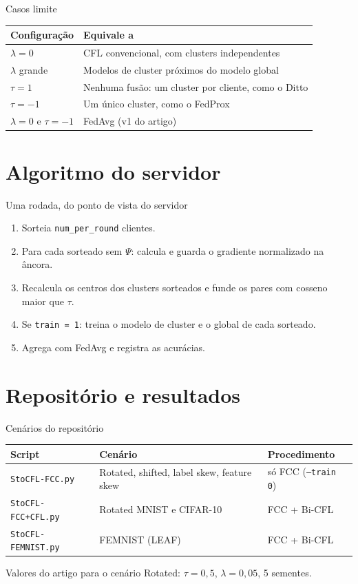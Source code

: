 \documentclass[aspectratio=169]{beamer}
\begin{document}
\begin{frame}{Casos limite}
  \begin{center}
    \begin{tabular}{@{}ll@{}}
      \toprule
      Configuração & Equivale a \\
      \midrule
      $\lambda = 0$ & CFL convencional, com clusters independentes \\
      $\lambda$ grande & Modelos de cluster próximos do modelo global \\
      $\tau = 1$ & Nenhuma fusão: um cluster por cliente, como o Ditto \\
      $\tau = -1$ & Um único cluster, como o FedProx \\
      $\lambda = 0$ e $\tau = -1$ & FedAvg (v1 do artigo) \\
      \bottomrule
    \end{tabular}
  \end{center}
\end{frame}

\section{Algoritmo do servidor}

\begin{frame}{Uma rodada, do ponto de vista do servidor}
  \begin{enumerate}
    \item Sorteia \texttt{num\_per\_round} clientes.
    \item Para cada sorteado sem $\Psi$: calcula e guarda o gradiente normalizado na âncora.
    \item Recalcula os centros dos clusters sorteados e funde os pares com cosseno maior que $\tau$.
    \item Se \texttt{train = 1}: treina o modelo de cluster e o global de cada sorteado.
    \item Agrega com FedAvg e registra as acurácias.
  \end{enumerate}
\end{frame}

\section{Repositório e resultados}

\begin{frame}{Cenários do repositório}
  \begin{tabular}{@{}lll@{}}
    \toprule
    Script & Cenário & Procedimento \\
    \midrule
    \texttt{StoCFL-FCC.py} & Rotated, shifted, label skew, feature skew & só FCC (\texttt{--train 0}) \\
    \texttt{StoCFL-FCC+CFL.py} & Rotated MNIST e CIFAR-10 & FCC + Bi-CFL \\
    \texttt{StoCFL-FEMNIST.py} & FEMNIST (LEAF) & FCC + Bi-CFL \\
    \bottomrule
  \end{tabular}
  \vspace{0.8em}

  Valores do artigo para o cenário Rotated: $\tau = 0{,}5$, $\lambda = 0{,}05$, 5 sementes.
\end{frame}
\end{document}
